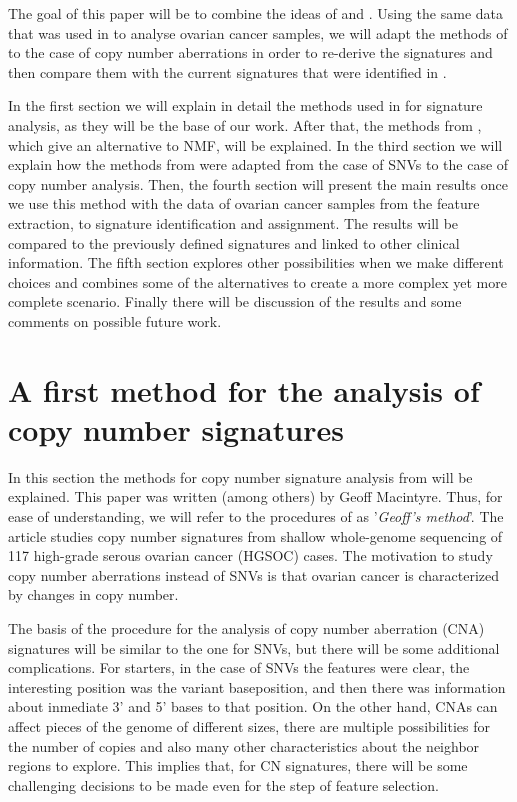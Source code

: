 \documentclass[a4paper]{article}
\begin{document}
The goal of this paper will be to combine the ideas of  \cite{Geoff} and  \cite{Shira}. Using the same data that was used in  \cite{Geoff} to analyse ovarian cancer samples, we will adapt the methods of  \cite{Shira} to the case of copy number aberrations in order to re-derive the signatures and then compare them with the current signatures that were identified in  \cite{Geoff}.

In the first section we will explain in detail the methods used in  \cite{Geoff} for signature analysis, as they will be the base of our work. After that, the methods from  \cite{Shira}, which give an alternative to NMF, will be explained. In the third section we will explain how the methods from  \cite{Shira} were adapted from the case of SNVs to the case of copy number analysis. Then, the fourth section will present the main results once we use this method with the data of ovarian cancer samples from the feature extraction, to signature identification and assignment. The results will be compared to the previously defined signatures and linked to other clinical information. The fifth section explores other possibilities when we make different choices and combines some of the alternatives to create a more complex yet more complete scenario. Finally there will be discussion of the results and some comments on possible future work.  

\section{A first method for the analysis of copy number signatures}
In this section the methods for copy number signature analysis from  \cite{Geoff} will be explained. This paper was written (among others) by Geoff Macintyre. Thus, for ease of understanding, we will refer to the procedures of  \cite{Geoff} as '\textit{Geoff's method}'. The article studies copy number signatures from shallow whole-genome sequencing of 117 high-grade serous ovarian cancer (HGSOC) cases. The motivation to study copy number aberrations instead of SNVs is that ovarian cancer is characterized by changes in copy number.

The basis of the procedure for the analysis of copy number aberration (CNA) signatures will be similar to the one for SNVs, but there will be some additional complications. For starters, in the case of SNVs the features were clear, the interesting position was the variant baseposition, and then there was information about inmediate 3' and 5' bases to that position.  On the other hand, CNAs can affect pieces of the genome of different sizes, there are multiple possibilities for the number of copies and also many other characteristics about the neighbor regions to explore. This implies that, for CN signatures, there will be some challenging decisions to be made even for the step of feature selection.
\end{document}
